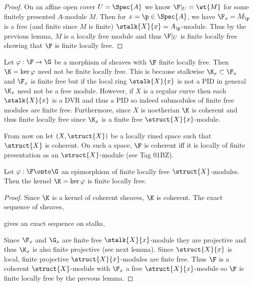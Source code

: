 \documentclass[12pt]{article}
\begin{document}
\begin{proof}
On an affine open cover $U = \Spec{A}$ we know $\F|_U = \wt{M}$ for some finitely presented $A$-module $M$. Then for $x = \p \in \Spec{A}$, we have $\F_x = M_\p$ is a free (and finite since $M$ is finite) $\stalk{X}{x} = A_\p$-module. Thus by the previous lemma, $M$ is a locally free module and thus $\F|_U$ is finite locally free showing that $\F$ is finite locally free.
\end{proof}

\begin{example}
Let $\varphi : \F \to \G$ be a morphism of sheaves with $\F$ finite locally free. Then $\K = \ker{\varphi}$ need not be finite locally free. This is because stalkwise $\K_x \subset \F_x$ and $\F_x$ is finite free but if the local ring $\stalk{X}{x}$ is not a PID in general $\K_x$ need not be a free module. However, if $X$ is a regular curve then each $\stalk{X}{x}$ is a DVR and thus a PID so indeed submodules of finite free modules are finite free. Furthermore, since $X$ is noetherian $\K$ is coherent and thus finite locally free since $\K_x$ is a finite free $\struct{X}{x}$-module.
\end{example}

\begin{rmk}
From now on let $(X, \struct{X})$ be a locally rined space such that $\struct{X}$ is coherent. On such a space, $\F$ is coherent iff it is locally of finite presentation as an $\struct{X}$-module (see Tag 01BZ).
\end{rmk}

\begin{prop}
Let $\varphi : \F \onto \G$ an epimorphism of finite locally free $\struct{X}$-modules. Then the kernel $\K = \ker{\varphi}$ is finite locally free.
\end{prop}

\begin{proof}
Since $\K$ is a kernel of coherent sheaves, $\K$ is coherent.
The exact sequence of sheaves,
\begin{center}
\end{center}
gives an exact sequence on stalks,
\begin{center}
\end{center}
Since $\F_x$ and $\G_x$ are finite free $\stalk{X}{x}$-module they are projective and thus $\K_x$ is also finite projective (see next lemma). Since $\struct{X}{x}$ is local, finite projective $\struct{X}{x}$-modules are finte free. Thus $\F$ is a coherent $\struct{X}$-module with $\F_x$ a free $\struct{X}{x}$-module so $\F$ is finite locally free by the prevous lemma.
\end{proof}
\end{document}
